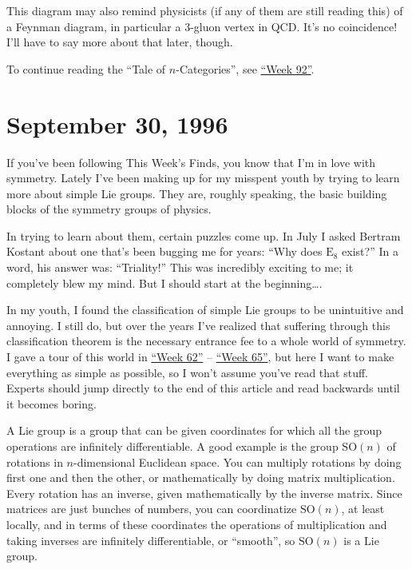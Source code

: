 \documentclass{article}
\begin{document}
This diagram may also remind physicists (if any of them are still
reading this) of a Feynman diagram, in particular a 3-gluon vertex in
QCD. It's no coincidence! I'll have to say more about that later,
though.

To continue reading the ``Tale of \(n\)-Categories'', see
\protect\hyperlink{week92}{``Week 92''}.



\hypertarget{week90}{%
\section{September 30, 1996}\label{week90}}

If you've been following This Week's Finds, you know that I'm in love
with symmetry. Lately I've been making up for my misspent youth by
trying to learn more about simple Lie groups. They are, roughly
speaking, the basic building blocks of the symmetry groups of physics.

In trying to learn about them, certain puzzles come up. In July I asked
Bertram Kostant about one that's been bugging me for years: ``Why does
\(\mathrm{E}_8\) exist?'' In a word, his answer was: ``Triality!'' This
was incredibly exciting to me; it completely blew my mind. But I should
start at the beginning\ldots.

In my youth, I found the classification of simple Lie groups to be
unintuitive and annoying. I still do, but over the years I've realized
that suffering through this classification theorem is the necessary
entrance fee to a whole world of symmetry. I gave a tour of this world
in \protect\hyperlink{week62}{``Week 62''} --
\protect\hyperlink{week65}{``Week 65''}, but here I want to make
everything as simple as possible, so I won't assume you've read that
stuff. Experts should jump directly to the end of this article and read
backwards until it becomes boring.

A Lie group is a group that can be given coordinates for which all the
group operations are infinitely differentiable. A good example is the
group \(\mathrm{SO}(n)\) of rotations in \(n\)-dimensional Euclidean
space. You can multiply rotations by doing first one and then the other,
or mathematically by doing matrix multiplication. Every rotation has an
inverse, given mathematically by the inverse matrix. Since matrices are
just bunches of numbers, you can coordinatize \(\mathrm{SO}(n)\), at
least locally, and in terms of these coordinates the operations of
multiplication and taking inverses are infinitely differentiable, or
``smooth'', so \(\mathrm{SO}(n)\) is a Lie group.
\end{document}
